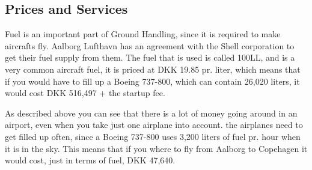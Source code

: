 \subsection{Prices and Services}

Fuel is an important part of Ground Handling, since it is required to make aircrafts fly. Aalborg Lufthavn has an agreement with the Shell corporation to get their fuel supply from them. The fuel that is used is called 100LL, and is a very common aircraft fuel, it is priced at DKK 19.85 pr. liter, which means that if you would have to fill up a Boeing 737-800, which can contain 26,020 liters, it would cost DKK 516,497 + the startup fee.

As described above you can see that there is a lot of money going around in an airport, even when you take just one airplane into account. the airplanes need to get filled up often, since a Boeing 737-800 uses 3,200 liters of fuel pr. hour when it is in the sky. This means that if you where to fly from Aalborg to Copehagen it would cost, just in terms of fuel, DKK 47,640.

%